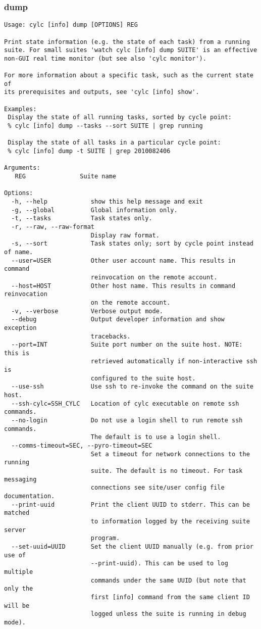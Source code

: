 \subsubsection{dump}
\label{dump}
\begin{lstlisting}
Usage: cylc [info] dump [OPTIONS] REG 

Print state information (e.g. the state of each task) from a running
suite. For small suites 'watch cylc [info] dump SUITE' is an effective
non-GUI real time monitor (but see also 'cylc monitor').

For more information about a specific task, such as the current state of
its prerequisites and outputs, see 'cylc [info] show'.

Examples:
 Display the state of all running tasks, sorted by cycle point:
 % cylc [info] dump --tasks --sort SUITE | grep running

 Display the state of all tasks in a particular cycle point:
 % cylc [info] dump -t SUITE | grep 2010082406

Arguments:
   REG               Suite name

Options:
  -h, --help            show this help message and exit
  -g, --global          Global information only.
  -t, --tasks           Task states only.
  -r, --raw, --raw-format
                        Display raw format.
  -s, --sort            Task states only; sort by cycle point instead of name.
  --user=USER           Other user account name. This results in command
                        reinvocation on the remote account.
  --host=HOST           Other host name. This results in command reinvocation
                        on the remote account.
  -v, --verbose         Verbose output mode.
  --debug               Output developer information and show exception
                        tracebacks.
  --port=INT            Suite port number on the suite host. NOTE: this is
                        retrieved automatically if non-interactive ssh is
                        configured to the suite host.
  --use-ssh             Use ssh to re-invoke the command on the suite host.
  --ssh-cylc=SSH_CYLC   Location of cylc executable on remote ssh commands.
  --no-login            Do not use a login shell to run remote ssh commands.
                        The default is to use a login shell.
  --comms-timeout=SEC, --pyro-timeout=SEC
                        Set a timeout for network connections to the running
                        suite. The default is no timeout. For task messaging
                        connections see site/user config file documentation.
  --print-uuid          Print the client UUID to stderr. This can be matched
                        to information logged by the receiving suite server
                        program.
  --set-uuid=UUID       Set the client UUID manually (e.g. from prior use of
                        --print-uuid). This can be used to log multiple
                        commands under the same UUID (but note that only the
                        first [info] command from the same client ID will be
                        logged unless the suite is running in debug mode).
\end{lstlisting}
